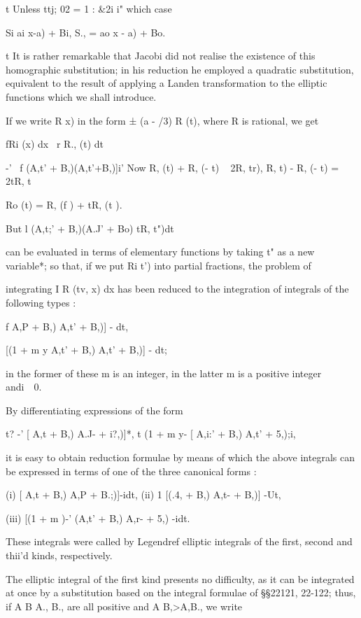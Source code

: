 t Unless ttj; 02 = 1 : \&2i i" which case

Si ai x-a) + Bi, S., = ao x - a) + Bo.

t It is rather remarkable that Jacobi did not realise the existence of
this homographic substitution; in his reduction he employed a
quadratic substitution, equivalent to the result of applying a Landen
transformation to the elliptic functions which we shall introduce.

%
%

If we write R x) in the form ± (a - /3) R (t), where R is rational, we
get

fRi (x) dx \ r R., (t) dt

-' ~f (A,t' + B,)(A,t'+B,)]i' Now R, (t) + R, (- t) ~ 2R, tr), R, t) -
R, (- t) = 2tR, t%

Ro (t) = R, (f ) + tR, (t ).

But l (A,t;' + B,)(A.J' + Bo) tR, t")dt

can be evaluated in terms of elementary functions by taking t" as a
new variable*; so that, if we put Ri t') into partial fractions, the
problem of

integrating I R (tv, x) dx has been reduced to the integration of
integrals of the following types :

 f A,P + B,) A,t' + B,)] - dt,

[(1 + m y A,t' + B,) A,t' + B,)] - dt;

in the former of these m is an integer, in the latter m is a positive
integer andi\ \ 0.

By differentiating expressions of the form

t? -' [ A,t + B,) A.J- + i?,)]*, t (1 + m y- [ A,i:' + B,) A,t' +
5,);i,

it is easy to obtain reduction formulae by means of which the above
integrals can be expressed in terms of one of the three canonical
forms :

(i) [ A,t + B,) A,P + B.;)]-idt, (ii) 1 [(.4, + B,) A,t- + B,)] -Ut,

(iii) [(1 + m )-' (A,t' + B,) A,r- + 5,) -idt.

These integrals were called by Legendref elliptic integrals of the
first, second and thii'd kinds, respectively.

The elliptic integral of the first kind presents no difficulty, as it
can be integrated at once by a substitution based on the integral
formulae of §§22121, 22-122; thus, if A B A., B., are all positive and
A B,>A,B., we write

